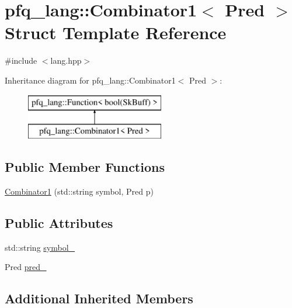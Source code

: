\hypertarget{structpfq__lang_1_1Combinator1}{\section{pfq\+\_\+lang\+:\+:Combinator1$<$ Pred $>$ Struct Template Reference}
\label{structpfq__lang_1_1Combinator1}
}


{\ttfamily \#include $<$lang.\+hpp$>$}

Inheritance diagram for pfq\+\_\+lang\+:\+:Combinator1$<$ Pred $>$\+:\begin{figure}[H]
\begin{center}
\leavevmode
\includegraphics[height=2.000000cm]{structpfq__lang_1_1Combinator1}
\end{center}
\end{figure}
\subsection*{Public Member Functions}
\begin{DoxyCompactItemize}
\item 
\hyperlink{structpfq__lang_1_1Combinator1_a56c94d3734f2976bd0e082d38cf8bd2b}{Combinator1} (std\+::string symbol, Pred p)
\end{DoxyCompactItemize}
\subsection*{Public Attributes}
\begin{DoxyCompactItemize}
\item 
std\+::string \hyperlink{structpfq__lang_1_1Combinator1_addfe327a3bf56ffd84f5c370c5fc3456}{symbol\+\_\+}
\item 
Pred \hyperlink{structpfq__lang_1_1Combinator1_ad4a0a97d1435bd35fe25796a88bbdebf}{pred\+\_\+}
\end{DoxyCompactItemize}
\subsection*{Additional Inherited Members}


